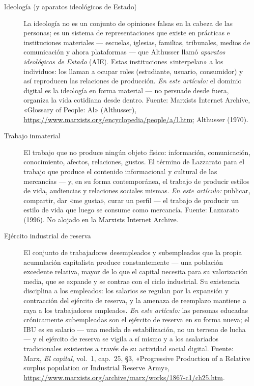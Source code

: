 \documentclass[11pt]{article}
\begin{document}
\begin{description}
\item[Ideología (y aparatos ideológicos de Estado)] La ideología no es
un conjunto de opiniones falsas en la cabeza de las personas; es un
sistema de representaciones que existe en prácticas e instituciones
materiales --- escuelas, iglesias, familias, tribunales, medios de
comunicación y ahora plataformas --- que Althusser llamó
\emph{aparatos ideológicos de Estado} (AIE). Estas instituciones
«interpelan» a los individuos: los llaman a ocupar roles (estudiante,
usuario, consumidor) y así reproducen las relaciones de producción.
\emph{En este artículo:} el dominio digital es la ideología en forma
material --- no persuade desde fuera, organiza la vida cotidiana desde
dentro. Fuente: Marxists Internet Archive, «Glossary of People: Al»
(Althusser),
\url{https://www.marxists.org/encyclopedia/people/a/l.htm};
Althusser (1970).

\item[Trabajo inmaterial] El trabajo que no produce ningún objeto
físico: información, comunicación, conocimiento, afectos, relaciones,
gustos. El término de Lazzarato para el trabajo que produce el
contenido informacional y cultural de las mercancías --- y, en su forma
contemporánea, el trabajo de producir estilos de vida, audiencias y
relaciones sociales mismas. \emph{En este artículo:} publicar,
compartir, dar «me gusta», curar un perfil --- el trabajo de producir
un estilo de vida que luego se consume como mercancía. Fuente:
Lazzarato (1996). No alojado en la Marxists Internet Archive.

\item[Ejército industrial de reserva] El conjunto de trabajadores
desempleados y subempleados que la propia acumulación capitalista
produce constantemente --- una población excedente relativa, mayor de lo
que el capital necesita para su valorización media, que se expande y se
contrae con el ciclo industrial. Su existencia disciplina a los
empleados: los salarios se regulan por la expansión y contracción del
ejército de reserva, y la amenaza de reemplazo mantiene a raya a los
trabajadores empleados. \emph{En este artículo:} las personas educadas
crónicamente subempleadas son el ejército de reserva en su forma nueva;
el IBU es su salario --- una medida de estabilización, no un terreno de
lucha --- y el ejército de reserva se vigila a sí mismo y a los
asalariados tradicionales existentes a través de su actividad social
digital. Fuente: Marx, \emph{El capital}, vol.~1, cap.~25, \S3,
«Progressive Production of a Relative surplus population or Industrial
Reserve Army»,
\url{https://www.marxists.org/archive/marx/works/1867-c1/ch25.htm}.


\end{description}
\end{document}
